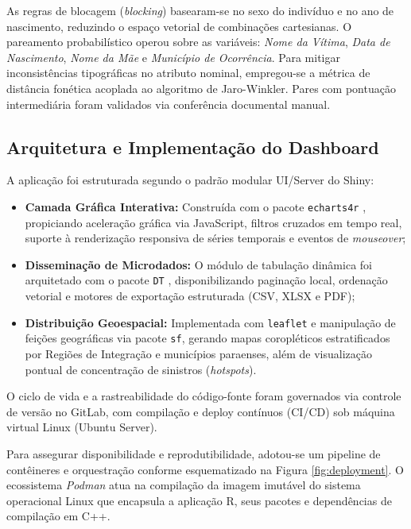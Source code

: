 \documentclass[sigconf, nonacm, screen, language=portuguese, language=spanish, language={main=english}]{acmart}
\begin{document}
As regras de blocagem (\textit{blocking}) basearam-se no sexo do indivíduo e no ano de nascimento, reduzindo o espaço vetorial de combinações cartesianas. O pareamento probabilístico operou sobre as variáveis: \textit{Nome da Vítima}, \textit{Data de Nascimento}, \textit{Nome da Mãe} e \textit{Município de Ocorrência}. Para mitigar inconsistências tipográficas no atributo nominal, empregou-se a métrica de distância fonética acoplada ao algoritmo de Jaro-Winkler. Pares com pontuação intermediária foram validados via conferência documental manual.

\subsection{Arquitetura e Implementação do Dashboard}
A aplicação foi estruturada segundo o padrão modular UI/Server do Shiny:
\begin{itemize}
    \item \textbf{Camada Gráfica Interativa:} Construída com o pacote \texttt{echarts4r} \cite{echarts4r2023}, propiciando aceleração gráfica via JavaScript, filtros cruzados em tempo real, suporte à renderização responsiva de séries temporais e eventos de \textit{mouseover};
    \item \textbf{Disseminação de Microdados:} O módulo de tabulação dinâmica foi arquitetado com o pacote \texttt{DT} \cite{dt2024}, disponibilizando paginação local, ordenação vetorial e motores de exportação estruturada (CSV, XLSX e PDF);
    \item \textbf{Distribuição Geoespacial:} Implementada com \texttt{leaflet} \cite{leaflet2024} e manipulação de feições geográficas via pacote \texttt{sf}, gerando mapas coropléticos estratificados por Regiões de Integração e municípios paraenses, além de visualização pontual de concentração de sinistros (\textit{hotspots}).
\end{itemize}

O ciclo de vida e a rastreabilidade do código-fonte foram governados via controle de versão no GitLab, com compilação e deploy contínuos (CI/CD) sob máquina virtual Linux (Ubuntu Server).

Para assegurar disponibilidade e reprodutibilidade, adotou-se um pipeline de contêineres e orquestração conforme esquematizado na Figura \ref{fig:deployment}. O ecossistema \textit{Podman} \cite{podman2026} atua na compilação da imagem imutável do sistema operacional Linux que encapsula a aplicação R, seus pacotes e dependências de compilação em C++.
\end{document}

